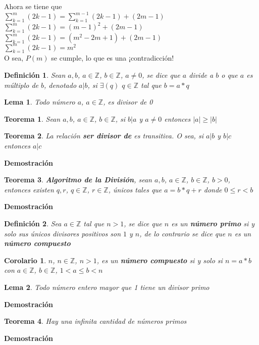 \documentclass[a4paper,1pt]{report}
\newtheorem*{teo}{Teorema}
\newtheorem*{cor}{Corolario}
\newtheorem*{dfn}{Definición}
\newtheorem*{lem}{Lema}
\begin{document}
Ahora se tiene que\\ 
$\sum^m_{k=1}(2k-1)=\sum^{m-1}_{k=1}(2k-1)+(2m-1)$\\
$\sum^m_{k=1}(2k-1)=(m-1)^2+(2m-1)$\\
$\sum^m_{k=1}(2k-1)=(m^2-2m+1)+(2m-1)$\\
$\sum^m_{k=1}(2k-1)=m^2$\\
O sea, $P(m)$ se cumple, lo que es una ¡contradicción!

\begin{dfn}
 Sean $a,b$, $a\in\mathbb{Z}$, $b\in\mathbb{Z}$, $a\neq 0$, se dice que $a$ divide a $b$ o que $a$ es múltiplo de $b$, denotado $a|b$, si $\exists(q)$ $q\in\mathbb{Z}$ tal que $b=a*q$
\end{dfn}

\begin{lem}
 Todo número $a$, $a\in\mathbb{Z}$, es divisor de 0
\end{lem}

\begin{teo}
 Sean $a,b$, $a\in\mathbb{Z}$, $b\in\mathbb{Z}$, si $b|a$ y $a\neq 0$ entonces $|a| \geq |b|$
\end{teo}



\begin{teo}
 La relación \textbf{ser divisor de} es transitiva. O sea, si $a|b$ y $b|c$ entonces $a|c$
\end{teo}

\textbf{Demostración}

\begin{teo}
 \textbf{Algoritmo de la División}, sean $a,b$, $a\in\mathbb{Z}$, $b\in\mathbb{Z}$, $b > 0$, entonces existen $q,r$, $q\in\mathbb{Z}$, $r\in\mathbb{Z}$, únicos tales que $a = b*q+r$ donde $0\leq r < b$
\end{teo}

\textbf{Demostración}

\begin{dfn}
 Sea $a\in\mathbb{Z}$ tal que $n>1$, se dice que $n$ es un \textbf{número primo} si y solo sus únicos divisores positivos son $1$ y $n$, de lo contrario se dice que $n$ es un \textbf{número compuesto}
\end{dfn}

\begin{cor}
 $n$, $n\in\mathbb{Z}$, $n>1$, es un \textbf{número compuesto} si y solo si $n=a*b$ con $a\in\mathbb{Z}$, $b\in\mathbb{Z}$, $1<a\leq b < n$
\end{cor}

\begin{lem}
 Todo número entero mayor que 1 tiene un divisor primo
\end{lem}

\textbf{Demostración}

\begin{teo}
 Hay una infinita cantidad de números primos
\end{teo}

\textbf{Demostración}
\end{document}
